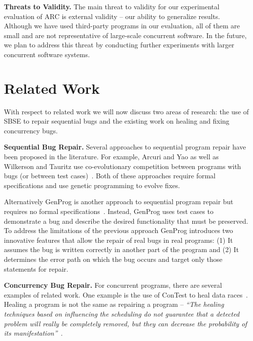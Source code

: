 \documentclass[runningheads,a4paper]{llncs}
\begin{document}

\textbf{Threats to Validity.} The main threat to validity for our experimental evaluation of ARC is external validity -- our ability to generalize results. Although we have used third-party programs in our evaluation, all of them are small and are not representative of large-scale concurrent software. In the future, we plan to address this threat by conducting further experiments with larger concurrent software systems.

\section{Related Work}
\label{sec:related_works}

With respect to related work we will now discuss two areas of research: the use of SBSE to repair sequential bugs and the existing work on healing and fixing concurrency bugs.

\textbf{Sequential Bug Repair.} Several approaches to sequential program repair have been proposed in the literature. For example, Arcuri and Yao as well as Wilkerson and Tauritz use co-evolutionary competition between programs with bugs (or between test cases)~\cite{AY08, Arc08, WT10}.  Both of these approaches require formal specifications and use genetic programming to evolve fixes.  

Alternatively GenProg is another approach to sequential program repair but requires no formal specifications~\cite{WNLF09}. Instead, GenProg uses test cases to demonstrate a bug and describe the desired functionality that must be preserved. To address the limitations of the previous approach GenProg introduces two innovative features that allow the repair of real bugs in real programs: (1) It assumes the bug is written correctly in another part of the program and (2) It determines the error path on which the bug occurs and target only those statements  for repair. 


\textbf{Concurrency Bug Repair.} For concurrent programs, there are several examples of related work. One example is the use of ConTest to heal data races~\cite{KLT+07, LVK08}. Healing a program is not the same as repairing a program -- \textit{``The healing techniques based on influencing the scheduling do not guarantee that a detected problem will really be completely removed, but they can decrease the probability of its manifestation''}~\cite{LVK08}. %
\end{document}
